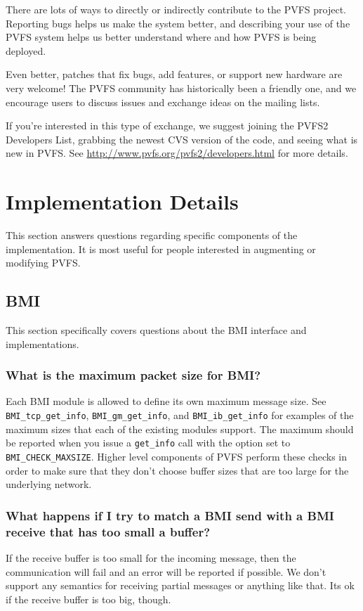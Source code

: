 \documentclass[11pt,letterpaper]{article}
\begin{document}
There are lots of ways to directly or indirectly contribute to the PVFS
project.  Reporting bugs helps us make the system better, and describing your
use of the PVFS system helps us better understand where and how PVFS is
being deployed.

Even better, patches that fix bugs, add features, or support new hardware are
very welcome!  The PVFS community has historically been a friendly one, and we
encourage users to discuss issues and exchange ideas on the mailing lists.

If you're interested in this type of exchange, we suggest joining the PVFS2
Developers List, grabbing the newest CVS version of the code, and seeing what
is new in PVFS.  See \url{http://www.pvfs.org/pvfs2/developers.html} for more
details.

%
%
\section{Implementation Details}

This section answers questions regarding specific components of the
implementation.  It is most useful for people interested in augmenting or
modifying PVFS.

\subsection{BMI}

This section specifically covers questions about the BMI interface and
implementations.

\subsubsection{What is the maximum packet size for BMI?}

Each BMI module is allowed to define its own maximum message size.  See
\texttt{BMI\_tcp\_get\_info}, \texttt{BMI\_gm\_get\_info}, and
\texttt{BMI\_ib\_get\_info} for examples of the maximum sizes that each of the
existing modules support.  The maximum should be reported when you issue a
\texttt{get\_info} call with the option set to \texttt{BMI\_CHECK\_MAXSIZE}.
Higher level components of PVFS perform these checks in order to make sure
that they don't choose buffer sizes that are too large for the underlying
network.

\subsubsection{What happens if I try to match a BMI send with a BMI receive
               that has too small a buffer?}

If the receive buffer is too small for the incoming message, then the
communication will fail and an error will be reported if possible.  We
don't support any semantics for receiving partial messages or anything like
that.  Its ok if the receive buffer is too big, though.
    
\end{document}
